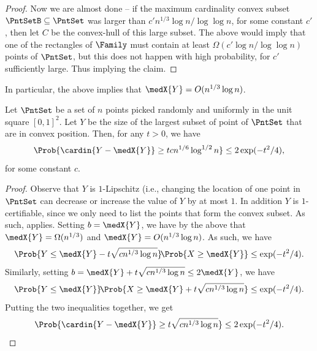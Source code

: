 \begin{proof}
    Now we are almost done -- if the maximum cardinality convex subset
    $\PntSetB \subseteq \PntSet$ was larger than
    $c'n^{1/3} \log n / \log \log n$, for some constant $c'$, then let
    $C$ be the convex-hull of this large subset. The above would imply
    that one of the rectangles of $\Family$ must contain at least
    $\Omega(c' \log n / \log \log n)$ points of $\PntSet$, but this
    does not happen with high probability, for $c'$ sufficiently
    large. Thus implying the claim.
\end{proof}

In particular, the above implies that $\medX{Y} = O(n^{1/3} \log n)$.

\begin{theorem}
    Let $\PntSet$ be a set of $n$ points picked randomly and uniformly
    in the unit square $[0,1]^2$. Let $Y$ be the size of the largest
    subset of point of $\PntSet$ that are in convex position. Then,
    for any $t>0$, we have
    \begin{equation*}
        \Prob{ \cardin{Y - \medX{Y} } \geq  t c n^{1/6} \log^{1/2} n} 
        \leq
        2\exp(-t^2/4),
    \end{equation*}
    for some constant $c$.
\end{theorem}
\begin{proof}
    Observe that $Y$ is $1$-Lipschitz (i.e., changing the location of
    one point in $\PntSet$ can decrease or increase the value of $Y$
    by at most $1$. In addition $Y$ is $1$-certifiable, since we only
    need to list the points that form the convex subset. As such,
     applies. Setting $b=\medX{Y}$, we
    have by the above that $\medX{Y} =\Omega(n^{1/3})$ and
    $\medX{Y} = O(n^{1/3} \log n)$. As such, we have
    \begin{equation*}
        \Prob{ Y \leq \medX{Y}- t\sqrt{c n^{1/3} \log n}}%
        \!\Prob{X \geq \medX{Y}} \leq \exp(-t^2/4).
    \end{equation*}
    Similarly, setting $b = \medX{Y} + t \sqrt{c n^{1/3} \log n} \leq
    2 \medX{Y}$, we have
    \begin{equation*}
        \Prob{ Y \leq \medX{Y}}%
        \!\Prob{X \geq \medX{Y} + t \sqrt{c n^{1/3} \log n} } \leq \exp(-t^2/4).
    \end{equation*}
    Putting the two inequalities together, we get
    \begin{equation*}
        \Prob{ \cardin{Y - \medX{Y}} \geq  t \sqrt{c n^{1/3} \log n} }
        \leq
        2\exp(-t^2/4).
    \end{equation*}   
\end{proof}

